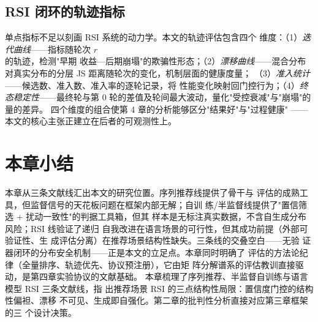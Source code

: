 \subsection{RSI 闭环的轨迹指标}
单点指标不足以刻画 RSI 系统的动力学。本文的轨迹评估包含四个
维度：（1）\emph{迭代曲线}——指标随轮次 $r$ 的轨迹，检测"早期
收益—后期崩塌"的欺骗性形态；（2）\emph{漂移曲线}——混合分布
对真实分布的分层 JS 距离随轮次的变化，机制层面的健康度量；
（3）\emph{准入统计}——候选数、准入数、准入率的逐轮记录，将
性能变化映射回门控行为；（4）\emph{终态稳定性}——最终轮与第
0 轮的差值及轮间最大波动，量化"受控衰减"与"崩塌"的量的差异。
四个维度的组合使第 4 章的分析能够区分"结果好"与"过程健康"
——本文的核心主张正建立在后者的可观测性上。

\section{本章小结}
本章从三条文献线汇出本文的研究位置。序列推荐线提供了骨干与
评估的成熟工具，但监督信号的天花板问题在框架内部无解；自训
练/半监督线提供了"置信筛选 + 扰动一致性"的判据工具箱，但其
样本是无标注真实数据，不含自生成分布风险；RSI 线验证了递归
自我改进在语言场景的可行性，但其成功前提（外部可验证性、生
成评估分离）在推荐场景结构性缺失。三条线的交叠空白——无验
证器闭环的分布安全机制——正是本文的立足点。本章同时明确了
评估的方法论纪律（全量排序、轨迹优先、协议预注册），它由矩
阵分解谱系的评估教训直接驱动，是第四章实验协议的文献基础。
本章梳理了序列推荐、半监督自训练与语言模型 RSI 三条文献线，指
出推荐场景 RSI 的三点结构性局限：置信度门控的结构性偏袒、漂移
不可见、生成即自强化。第二章的批判性分析直接对应第三章框架的三
个设计决策。
